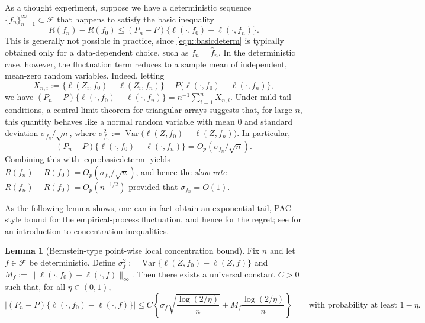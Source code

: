\documentclass[11pt]{article}
\theoremstyle{plain}
\theoremstyle{definition} %
\newtheorem{lemma}{Lemma}
\newcommand{\Var}{\operatorname{Var}}
\begin{document}
As a thought experiment, suppose we have a deterministic sequence
\(\{f_n\}_{n=1}^\infty \subset \mathcal F\) that happens to satisfy the basic
inequality
\begin{equation}
\label{eqn::basicdeterm}
R(f_n)-R(f_0)\le (P_n-P)\{\ell(\cdot,f_0)-\ell(\cdot,f_n)\}.
\end{equation}
This is generally not possible in practice, since \eqref{eqn::basicdeterm} is
typically obtained only for a data-dependent choice, such as \(f_n=\hat f_n\).
In the deterministic case, however, the fluctuation term reduces to a sample
mean of independent, mean-zero random variables. Indeed, letting
\[
X_{n,i}
:=
\bigl\{\ell(Z_i,f_0)-\ell(Z_i,f_n)\bigr\}
-
P\{\ell(\cdot,f_0)-\ell(\cdot,f_n)\},
\]
we have \((P_n-P)\{\ell(\cdot,f_0)-\ell(\cdot,f_n)\}=n^{-1}\sum_{i=1}^n X_{n,i}\).
Under mild tail conditions, a central limit theorem for triangular arrays
suggests that, for large \(n\), this quantity behaves like a normal random
variable with mean \(0\) and standard deviation \(\sigma_{f_n}/\sqrt{n}\), where
\(\sigma_{f_n}^2:=\Var\bigl(\ell(Z,f_0)-\ell(Z,f_n)\bigr)\). In particular,
\[
(P_n-P)\{\ell(\cdot,f_0)-\ell(\cdot,f_n)\}=O_p(\sigma_{f_n}/\sqrt{n}).
\]
Combining this with \eqref{eqn::basicdeterm} yields
\(R(f_n)-R(f_0)=O_p(\sigma_{f_n}/\sqrt{n})\), and hence the \emph{slow rate}
\(R(f_n)-R(f_0)=O_p(n^{-1/2})\) provided that \(\sigma_{f_n} = O(1)\).


As the following lemma shows, one can in fact obtain an exponential-tail, PAC-style bound for the empirical-process fluctuation, and hence for the regret; see \cite{sridharan2002gentle} for an introduction to concentration inequalities.


\begin{lemma}[Bernstein-type point-wise local concentration bound]
\label{lem:fixed_fn_bernstein}
Fix \(n\) and let \(f\in\mathcal F\) be deterministic. Define
\(\sigma_f^2:=\Var\{\ell(Z,f_0)-\ell(Z,f)\}\) and
\(M_f:=\|\ell(\cdot,f_0)-\ell(\cdot,f)\|_{\infty}\).
Then there exists a universal constant \(C>0\) such that, for all
\(\eta\in(0,1)\),
\[
\left|(P_n-P)\{\ell(\cdot,f_0)-\ell(\cdot,f)\}\right|
\le
C\left\{
\sigma_f\sqrt{\frac{\log(2/\eta)}{n}}
+
M_f\frac{\log(2/\eta)}{n}
\right\}
\qquad\text{with probability at least }1-\eta.
\]
\end{lemma}
\end{document}
